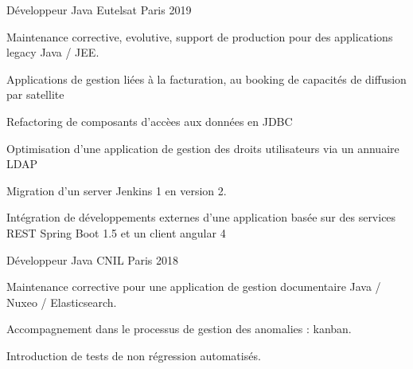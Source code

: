 

\begin{cventries}

  \cventry
    {Développeur Java} %
    {Eutelsat}
    {Paris} %
    {2019} %
    {
      \begin{cvitems} %
        \item {Maintenance corrective, evolutive, support de production pour des applications legacy Java / JEE.}
        \item {Applications de gestion liées à la facturation, au booking de capacités de diffusion par satellite}
        \item {Refactoring de composants d'accèes aux données en JDBC}
        \item {Optimisation d'une application de gestion des droits utilisateurs via un annuaire LDAP}
        \item {Migration d'un server Jenkins 1 en version 2.}
        \item {Intégration de développements externes d'une application basée sur des services REST Spring Boot 1.5 et un client angular 4}
      \end{cvitems}
    }

  \cventry
    {Développeur Java} %
    {CNIL} %
    {Paris} %
    {2018} %
    {
      \begin{cvitems} %
        \item {Maintenance corrective pour une application de gestion documentaire Java / Nuxeo / Elasticsearch.}
        \item {Accompagnement dans le processus de gestion des anomalies : kanban.}
        \item {Introduction de tests de non régression automatisés.}
      \end{cvitems}
    }


\end{cventries}
